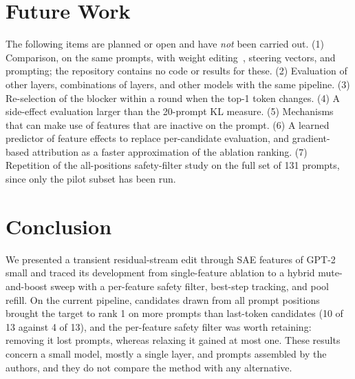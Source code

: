\documentclass[conference]{IEEEtran}
\begin{document}
\section{Future Work}
\label{sec:future}
The following items are planned or open and have \emph{not} been carried out. (1) Comparison, on the same prompts, with weight editing~\cite{meng2022rome}, steering vectors, and prompting; the repository contains no code or results for these. (2) Evaluation of other layers, combinations of layers, and other models with the same pipeline. (3) Re-selection of the blocker within a round when the top-1 token changes. (4) A side-effect evaluation larger than the 20-prompt KL measure. (5) Mechanisms that can make use of features that are inactive on the prompt. (6) A learned predictor of feature effects to replace per-candidate evaluation, and gradient-based attribution as a faster approximation of the ablation ranking. (7) Repetition of the all-positions safety-filter study on the full set of 131 prompts, since only the pilot subset has been run.

\section{Conclusion}
We presented a transient residual-stream edit through SAE features of GPT-2 small and traced its development from single-feature ablation to a hybrid mute-and-boost sweep with a per-feature safety filter, best-step tracking, and pool refill. On the current pipeline, candidates drawn from all prompt positions brought the target to rank 1 on more prompts than last-token candidates (10 of 13 against 4 of 13), and the per-feature safety filter was worth retaining: removing it lost prompts, whereas relaxing it gained at most one. These results concern a small model, mostly a single layer, and prompts assembled by the authors, and they do not compare the method with any alternative.
\end{document}
